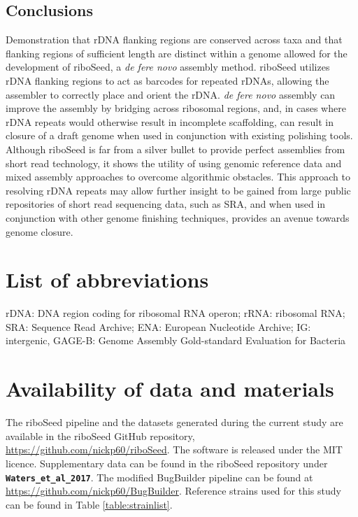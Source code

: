 \documentclass[10pt]{article}
\begin{document}
\begin{linenumbers}
\section*{Conclusions}
Demonstration that rDNA flanking regions are conserved across taxa and that flanking regions of sufficient length are distinct within a genome allowed for the development of riboSeed, a \textit{de fere novo} assembly method. riboSeed  utilizes rDNA flanking regions to act as barcodes for repeated rDNAs, allowing the assembler to correctly place and orient the rDNA. \textit{de fere novo} assembly can improve the assembly by bridging across ribosomal regions, and, in cases where rDNA repeats would otherwise result in incomplete scaffolding, can result in closure of a draft genome when used in conjunction with existing polishing tools. Although riboSeed is far from a silver bullet to provide perfect assemblies from short read technology, it shows the utility of using genomic reference data and mixed assembly approaches to overcome algorithmic obstacles. This approach to resolving rDNA repeats may allow further insight to be gained from large public repositories of short read sequencing data, such as SRA, and when used in conjunction with other genome finishing techniques, provides an avenue towards genome closure.

\end{linenumbers}
\baselineskip13pt

\section*{List of abbreviations}
rDNA: DNA region coding for ribosomal RNA operon; rRNA: ribosomal RNA; SRA: Sequence Read Archive; ENA: European Nucleotide Archive; IG: intergenic, GAGE-B: Genome Assembly Gold-standard Evaluation for Bacteria


\section*{Availability of data and materials}
The riboSeed pipeline and the datasets generated during the current study are available in the riboSeed GitHub repository, \url{https://github.com/nickp60/riboSeed}. The software is released under the MIT licence. Supplementary data can be found in the riboSeed repository under \textbf{\texttt{Waters\_et\_al\_2017}}. The modified BugBuilder pipeline can be found at \url{https://github.com/nickp60/BugBuilder}. Reference strains used for this study can be found in Table \ref{table:strainlist}.
\end{document}
